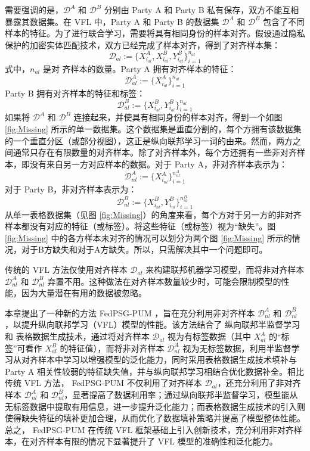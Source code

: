 需要强调的是，$\mathcal{D}^A$ 和 $\mathcal{D}^B$ 分别由 Party A 和 Party B 私有保存，双方不能互相暴露其数据集。在 VFL 中，Party A 和 Party B 的数据集 $\mathcal{D}^A$ 和 $\mathcal{D}^B$ 包含了不同样本的特征。为了进行联合学习，需要将具有相同身份的样本对齐。假设通过隐私保护的加密实体匹配技术，双方已经完成了样本对齐，得到了对齐样本集：
\begin{equation}
	\mathcal{D}_{al} := \{X^A_{i_{al}}, X^B_{i_{al}}, Y^B_{i_{al}}\}_{i=1}^{n_{al}}
\end{equation}
式中，$n_{al}$ 是对 齐样本的数量。Party A 拥有对齐样本的特征：
\begin{equation}
	\mathcal{D}^A_{al} := \{X^A_{i_{al}}\}_{i=1}^{n_{al}}
\end{equation}
Party B 拥有对齐样本的特征和标签：
\begin{equation}
	\mathcal{D}^B_{al} := \{X^B_{i_{al}}, Y^B_{i_{al}}\}_{i=1}^{n_{al}}
\end{equation}
如果将 $\mathcal{D}^A$ 和 $\mathcal{D}^B$ 连接起来，并使具有相同身份的样本对齐，得到一个如图 \ref{fig:Missing} 所示的单一数据集。这个数据集是垂直分割的，每个方拥有该数据集的一个垂直分区（或部分视图），这正是纵向联邦学习一词的由来。然而，两方之间通常只存在有限数量的对齐样本。除了对齐样本外，每个方还拥有一些非对齐样本，即没有来自另一方对应样本的数据。对于 Party A，非对齐样本表示为：
\begin{equation}
	\mathcal{D}^A_{nl} := \{X^A_{i_{nl}}\}_{i=1}^{n^A_{nl}}
\end{equation}
对于 Party B，非对齐样本表示为：
\begin{equation}
	\mathcal{D}^B_{nl} := \{X^B_{i_{nl}}, Y^B_{i_{nl}}\}_{i=1}^{n^B_{nl}}
\end{equation}
从单一表格数据集（见图 \ref{fig:Missing}）的角度来看，每个方对于另一方的非对齐样本都没有对应的特征（或标签）。将这些特征（或标签）视为“缺失”。图 \ref{fig:Missing} 中的各方样本未对齐的情况可以划分为两个图 \ref{fig:Missing} 所示的情况，对于B方缺失和对于A方缺失。所以，只需解决其中一个问题即可。


传统的 VFL 方法仅使用对齐样本 $\mathcal{D}_{al}$ 来构建联邦机器学习模型，而将非对齐样本 $\mathcal{D}^A_{nl}$ 和 $\mathcal{D}^B_{nl}$ 弃置不用。这种做法在对齐样本数量较少时，可能会限制模型的性能，因为大量潜在有用的数据被忽略。

本章提出了一种新的方法  FedPSG-PUM ，旨在充分利用非对齐样本 $\mathcal{D}^A_{nl}$ 和 $\mathcal{D}^B_{nl}$，以提升纵向联邦学习（VFL）模型的性能。该方法结合了 纵向联邦半监督学习 和 表格数据生成技术，通过将对齐样本 $\mathcal{D}_{al}$ 视为有标签数据（其中 $X^A_{al}$ 的“标签”可看作 $X^B_{al}$ 的特征值），而将非对齐样本 $\mathcal{D}^A_{nl}$ 视为无标签数据，利用半监督学习从对齐样本中学习以增强模型的泛化能力，同时采用表格数据生成技术填补与 Party A 相关性较弱的特征缺失值，并与纵向联邦学习相结合优化数据补全。相比传统 VFL 方法， FedPSG-PUM  不仅利用了对齐样本 $\mathcal{D}_{al}$，还充分利用了非对齐样本 $\mathcal{D}^A_{nl}$ 和 $\mathcal{D}^B_{nl}$，显著提高了数据利用率；通过纵向联邦半监督学习，模型能从无标签数据中提取有用信息，进一步提升泛化能力；而表格数据生成技术的引入则使得缺失特征的填补更加合理，从而优化了数据填补策略并提高了模型整体性能。总之， FedPSG-PUM  在传统 VFL 框架基础上引入创新技术，充分利用非对齐样本，在对齐样本有限的情况下显著提升了 VFL 模型的准确性和泛化能力。
